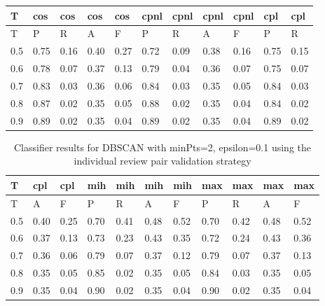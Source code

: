 \begin{center}
\begin{table}[!h]
\centering
\begin{tabular}{|l|l|l|l|l|l|l|l|l|l|l|}
  \hline
T & cos & cos & cos & cos & cpnl & cpnl & cpnl & cpnl & cpl & cpl \\ 
  \hline
T & P & R & A & F & P & R & A & F & P & R \\ 
   \hline
0.5 & 0.75 & 0.16 & 0.40 & 0.27 & 0.72 & 0.09 & 0.38 & 0.16 & 0.75 & 0.15 \\ 
  0.6 & 0.78 & 0.07 & 0.37 & 0.13 & 0.79 & 0.04 & 0.36 & 0.07 & 0.75 & 0.07 \\ 
  0.7 & 0.83 & 0.03 & 0.36 & 0.06 & 0.84 & 0.03 & 0.35 & 0.05 & 0.84 & 0.03 \\ 
  0.8 & 0.87 & 0.02 & 0.35 & 0.05 & 0.88 & 0.02 & 0.35 & 0.04 & 0.84 & 0.02 \\ 
  0.9 & 0.89 & 0.02 & 0.35 & 0.04 & 0.89 & 0.02 & 0.35 & 0.04 & 0.89 & 0.02 \\ 
   \hline
\end{tabular}
\end{table}
\begin{table}[!h]
\centering
\begin{tabular}{|l|l|l|l|l|l|l|l|l|l|l|}
  \hline
T & cpl & cpl & mih & mih & mih & mih & max & max & max & max \\ 
  \hline
T & A & F & P & R & A & F & P & R & A & F \\ 
   \hline
0.5 & 0.40 & 0.25 & 0.70 & 0.41 & 0.48 & 0.52 & 0.70 & 0.42 & 0.48 & 0.52 \\ 
  0.6 & 0.37 & 0.13 & 0.73 & 0.23 & 0.43 & 0.35 & 0.72 & 0.24 & 0.43 & 0.36 \\ 
  0.7 & 0.36 & 0.06 & 0.79 & 0.07 & 0.37 & 0.12 & 0.79 & 0.07 & 0.37 & 0.13 \\ 
  0.8 & 0.35 & 0.05 & 0.85 & 0.02 & 0.35 & 0.05 & 0.84 & 0.03 & 0.35 & 0.05 \\ 
  0.9 & 0.35 & 0.04 & 0.90 & 0.02 & 0.35 & 0.04 & 0.90 & 0.02 & 0.35 & 0.04 \\ 
   \hline
\end{tabular}
\caption{Classifier results for DBSCAN with minPts=2, epsilon=0.1 using the individual review pair validation strategy} 
\label{tab:dbscan-minpts-2-eps-0-1-individual}
\end{table}\end{center}
